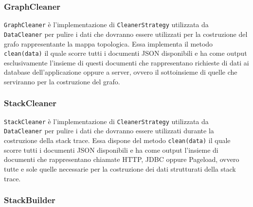	
	
\subsubsection{GraphCleaner}
\label{sec:GraphCleaner}

\texttt{GraphCleaner} è l'implementazione di \texttt{CleanerStrategy} utilizzata da \texttt{DataCleaner} per pulire i dati che dovranno essere utilizzati per la costruzione del grafo rappresentante la mappa topologica. Essa implementa il metodo \texttt{clean(data)} il quale scorre tutti i documenti JSON disponibili e ha come output esclusivamente l'insieme di questi documenti che rappresentano richieste di dati ai database dell'applicazione oppure a server, ovvero il sottoinsieme di quelle che serviranno per la costruzione del grafo.
	
\subsubsection{StackCleaner}
\label{sec:StackCleaner}

\texttt{StackCleaner} è l'implementazione di \texttt{CleanerStrategy} utilizzata da \texttt{DataCleaner} per pulire i dati che dovranno essere utilizzati durante la costruzione della stack trace. Essa dispone del metodo \texttt{clean(data)} il quale scorre tutti i documenti JSON disponibili e ha come output l'insieme di documenti che rappresentano chiamate HTTP, JDBC oppure Pageload, ovvero tutte e sole quelle necessarie per la costruzione dei dati strutturati della stack trace.



\subsubsection{StackBuilder}
\label{sec:StackBuilder}

